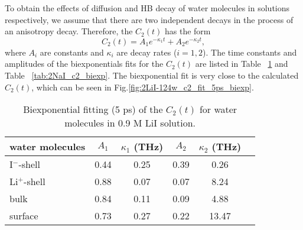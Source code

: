 To obtain the effects of diffusion and HB decay of water molecules
in solutions respectively, we assume that there are two independent 
decays in the process of an anisotropy decay. 
Therefore, the $C_2(t)$ has the form \cite{TanHS05}
\begin{equation}
C_2(t)=A_1e^{-\kappa_1 t} +A_2e^{-\kappa_2 t},
\label{eq:tcf3}
\end{equation}
where $A_i$ are constants and $\kappa_i$ are decay rates ($i=1, 2$). 
The time constants and amplitudes of the biexponentials fits for 
the $C_2(t)$ are listed in Table ~\ref{tab:2LiI_c2_biexp} and Table ~\ref{tab:2NaI_c2_biexp}.
The biexponential fit is very close to the calculated $C_2(t)$, which can be seen in Fig.\space\ref{fig:2LiI-124w_c2_fit_5ps_biexp}. 
%
\begin{table}[hbt]
\centering
\caption{\label{tab:2LiI_c2_biexp}%
	Biexponential fitting (5 ps) of the $C_2(t)$ for water molecules in 0.9 M LiI solution.}
\begin{tabular}{lccccc}
water molecules & $A_1$  & $\kappa_1$ (THz) & $A_2$ & $\kappa_2$ (THz) \\
\hline
I$^-$-shell & 0.44 & 0.25 & 0.39 & 0.26\\
Li$^+$-shell & 0.88 & 0.07 & 0.07 & 8.24\\
bulk & 0.84 & 0.11 & 0.09 & 4.88 \\
surface & 0.73 & 0.27 & 0.22 & 13.47 \\
\end{tabular}
\end{table}

